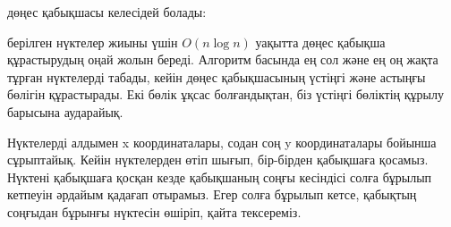 {\begin{samepage}
\begin{center}
\end{center}
\end{samepage}
дөңес қабықшасы келесідей болады:
\begin{center}
\end{center}


 \cite{and79} берілген нүктелер
жиыны үшін $O(n \log n)$ уақытта дөңес 
қабықша құрастырудың оңай жолын береді. 
Алгоритм басында ең сол және ең оң жақта 
тұрған нүктелерді табады, кейін дөңес қабықшасының
үстіңгі және астыңғы бөлігін құрастырады. Екі бөлік ұқсас болғандықтан, біз үстіңгі бөліктің құрылу барысына аударайық.


Нүктелерді алдымен x координаталары, содан соң
y координаталары бойынша сұрыптайық. 
Кейін нүктелерден өтіп шығып, бір-бірден қабықшаға қосамыз.
Нүктені қабықшаға қосқан кезде қабықшаның соңғы кесіндісі 
солға бұрылып кетпеуін әрдайым  қадағап отырамыз. Егер солға бұрылып кетсе, 
қабықтың соңғыдан бұрынғы нүктесін өшіріп, қайта тексереміз.


}
